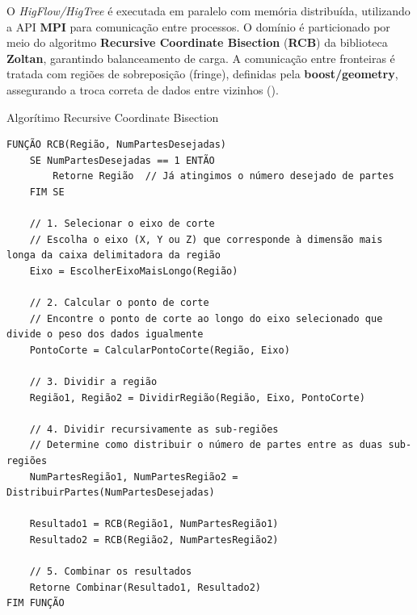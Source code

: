 \documentclass[../main/main.tex]{subfiles}
\begin{document}
\begin{frame}
	\begin{block}{}
		O \textit{HigFlow/HigTree}  é executada em paralelo com memória distribuída, utilizando a API \textbf{MPI} para comunicação entre processos.
		O domínio é particionado por meio do algoritmo \textbf{Recursive Coordinate Bisection} (\textbf{RCB}) da biblioteca \textbf{Zoltan}, garantindo balanceamento de carga.
		A comunicação entre fronteiras é tratada com regiões de sobreposição (fringe), definidas pela \textbf{boost/geometry}, assegurando a troca correta de dados entre vizinhos ().
	\end{block}
\end{frame}



\begin{frame}[fragile]{\smaller\smaller Algorítimo Recursive Coordinate Bisection}
        \vspace{-0.50cm}
		\fontsize{7}{8}
		\begin{verbatim}
FUNÇÃO RCB(Região, NumPartesDesejadas)
    SE NumPartesDesejadas == 1 ENTÃO
        Retorne Região  // Já atingimos o número desejado de partes
    FIM SE
    
    // 1. Selecionar o eixo de corte
    // Escolha o eixo (X, Y ou Z) que corresponde à dimensão mais longa da caixa delimitadora da região
    Eixo = EscolherEixoMaisLongo(Região)
    
    // 2. Calcular o ponto de corte
    // Encontre o ponto de corte ao longo do eixo selecionado que divide o peso dos dados igualmente
    PontoCorte = CalcularPontoCorte(Região, Eixo)
    
    // 3. Dividir a região
    Região1, Região2 = DividirRegião(Região, Eixo, PontoCorte)
    
    // 4. Dividir recursivamente as sub-regiões
    // Determine como distribuir o número de partes entre as duas sub-regiões
    NumPartesRegião1, NumPartesRegião2 = DistribuirPartes(NumPartesDesejadas)
    
    Resultado1 = RCB(Região1, NumPartesRegião1)
    Resultado2 = RCB(Região2, NumPartesRegião2)
    
    // 5. Combinar os resultados
    Retorne Combinar(Resultado1, Resultado2)
FIM FUNÇÃO
		\end{verbatim}

\end{frame}
\end{document}

